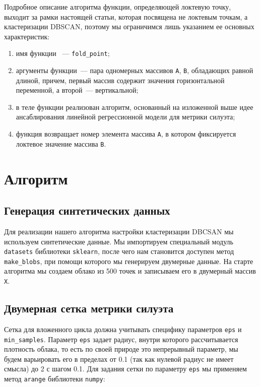 \documentclass[a4paper,12pt]{article}
\begin{document}
Подробное описание алгоритма функции, определяющей локтевую точку, выходит за рамки настоящей статьи, которая посвящена не локтевым точкам, а кластеризации DBSCAN, поэтому мы ограничимся лишь указанием ее основных характеристик: 

\medskip\noindent
\begin{enumerate}
	\item имя функции  — \texttt{fold\_point};
	\item аргументы функции — пара одномерных массивов \texttt{A}, \texttt{B}, обладающих равной длиной, причем, первый массив содержит значения горизонтальной переменной, а второй — вертикальной;
	\item в теле функции реализован алгоритм, основанный на изложенной выше идее ансаблирования линейной регрессионной модели для метрики силуэта;
	\item функция возвращает номер элемента массива \texttt{A}, в котором фиксируется локтевое значение массива \texttt{B}.
\end{enumerate}

\section{Алгоритм}

\subsection{Генерация синтетических данных}
Для реализации нашего алгоритма настройки кластеризации DBCSAN мы используем синтетические данные. Мы импортируем специальный модуль \texttt{datasets} библиотеки \texttt{sklearn}, после чего нам становится доступен метод  \texttt{make\_blobs}, при помощи которого мы генерируем двумерные данные. На старте алгоритма мы создаем облако из 500 точек и записываем его в двумерный массив \texttt{X}.

\subsection{Двумерная сетка метрики силуэта}

Сетка для вложенного цикла должна учитывать специфику параметров \texttt{eps} и \texttt{min\_samples}. Параметр \texttt{eps} задает радиус, внутри которого рассчитывается плотность облака, то есть по своей природе это непрерывный параметр, мы будем варьировать его в пределах от 0.1 (так как нулевой радиус не имеет смысла) до 2 с шагом 0.1. Для задания сетки по параметру \texttt{eps} мы применяем метод \texttt{arange} библиотеки \texttt{numpy}:
\end{document}
